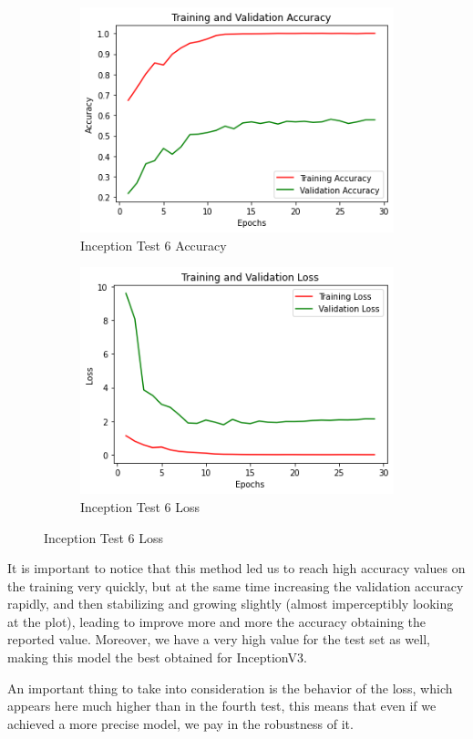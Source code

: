 \begin{figure}[H]
	\begin{subfigure}{0.5\textwidth}
		\includegraphics[width=0.9\linewidth]{img/inception/inceptionft3expacc.png} 
		\caption{Inception Test 6 Accuracy}
		\label{fig:inceptionft3expacc}
	\end{subfigure}
	\begin{subfigure}{0.5\textwidth}
		\includegraphics[width=0.9\linewidth]{img/inception/inceptionft3exploss.png}
		\caption{Inception Test 6 Loss}
		\label{fig:inceptionft3exploss}
	\end{subfigure}
\end{figure}

It is important to notice that this method led us to reach high accuracy values on the training very quickly, but at the same time increasing the validation accuracy rapidly, and then stabilizing and growing slightly (almost imperceptibly looking at the plot), leading to improve more and more the accuracy obtaining the reported value. Moreover, we have a very high value for the test set as well, making this model the best obtained for InceptionV3.

An important thing to take into consideration is the behavior of the loss, which appears here much higher than in the fourth test, this means that even if we achieved a more precise model, we pay in the robustness of it.


